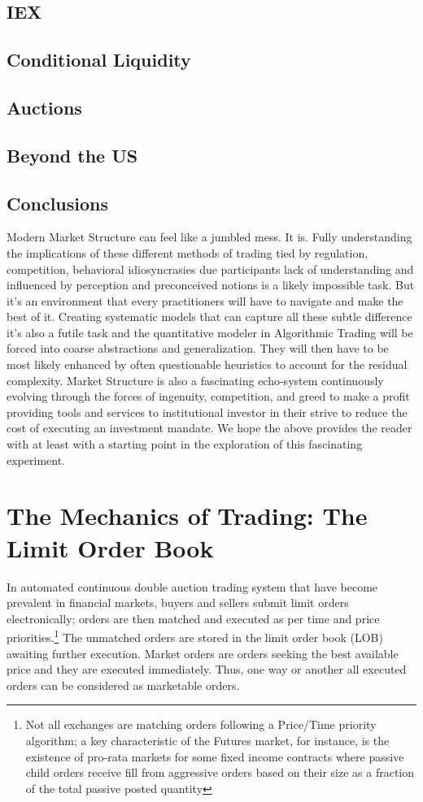 \subsection{IEX}
\subsection{Conditional Liquidity}
\subsection{Auctions}
\subsection{Beyond the US}
\subsection{Conclusions}
Modern Market Structure can feel like a jumbled mess. It is.  Fully understanding the implications of these different methods of trading tied by regulation, competition, behavioral idiosyncrasies due participants lack of understanding and influenced by perception and preconceived notions  is a likely impossible task. But it's an environment that every practitioners will have to navigate and make the best of it. Creating systematic models that can capture all these subtle difference it's also a futile task and the quantitative modeler in Algorithmic Trading will be forced into coarse abstractions and generalization. They will then have to be most likely enhanced by often questionable heuristics to account for the residual complexity. 
Market Structure is also a fascinating echo-system continuously evolving through the forces of ingenuity, competition, and greed to make a profit providing tools and services to institutional investor in their  strive to reduce the cost of executing an investment mandate. We hope the above provides the reader with at least with a starting point in the exploration of this fascinating  experiment.

\section{The Mechanics of Trading: The Limit Order Book}

In automated continuous double auction trading system that have become prevalent in financial markets, buyers and sellers submit limit orders electronically; orders are then matched and executed as per time and price priorities.\footnote{Not all exchanges are matching orders following a Price/Time priority algorithm; a key characteristic of the Futures market, for instance, is the existence of pro-rata markets for some fixed income contracts where passive child orders receive fill from aggressive orders based on their size as a fraction of the total passive posted quantity} The unmatched orders are stored in the limit order book (LOB) awaiting further execution. Market orders are orders seeking the best available price and they are executed immediately. Thus, one way or another all executed orders can be considered as marketable orders.


